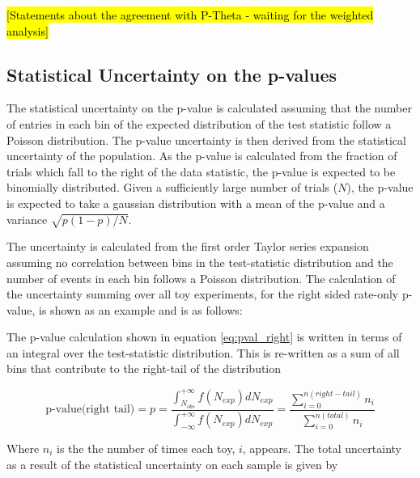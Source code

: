 \hl{[Statements about the agreement with P-Theta - waiting for the weighted analysis]}


\subsection{Statistical Uncertainty on the p-values}
The statistical uncertainty on the p-value is calculated assuming that the number of entries in each bin of the expected distribution of the test statistic follow a Poisson distribution. The p-value uncertainty is then derived from the statistical uncertainty of the population. As the p-value is calculated from the fraction of trials which fall to the right of the data statistic, the p-value is expected to be binomially distributed. Given a sufficiently large number of trials ($N$), the p-value is expected to take a gaussian distribution with a mean of the p-value and a variance $\sqrt{p(1-p)/N}$. %

The uncertainty is calculated from the first order Taylor series expansion assuming no correlation between bins in the test-statistic distribution and the number of events in each bin follows a Poisson distribution. The calculation of the uncertainty summing over all toy experiments, for the right sided rate-only p-value, is shown as an example and is as follows:

The p-value calculation shown in equation \ref{eq:pval_right} is written in terms of an integral over the test-statistic distribution. This is re-written as a sum of all bins that contribute to the right-tail of the distribution

\begin{equation} \label{eq:pval_pn_pd}
\textrm{p-value} \textrm{(right tail)} = p =
\frac{\int_{N_{obs}}^{+\infty} f \left( N_{exp} \right) dN_{exp}}{ \int_{-\infty}^{+\infty} f \left( N_{exp} \right) dN_{exp}} =
\frac{\sum_{i=0}^{n(right-tail)} n_{i}}{\sum_{i=0}^{n(total)} n_{i}}
\end{equation}

Where $n_{i}$ is the the number of times each toy, $i$, appears. The total uncertainty as a result of the statistical uncertainty on each sample is given by

